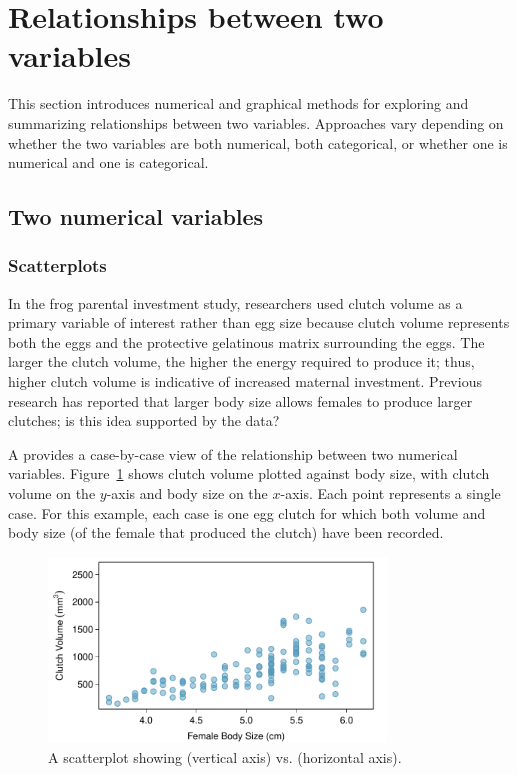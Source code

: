 \section{Relationships between two variables}

This section introduces numerical and graphical methods for exploring and summarizing relationships between two variables. Approaches vary depending on whether the two variables are both numerical, both categorical, or whether one is numerical and one is categorical.

\subsection{Two numerical variables}

\subsubsection{Scatterplots}
\label{scatterPlots}

In the frog parental investment study, researchers used clutch volume as a primary variable of interest rather than egg size because clutch volume represents both the eggs and the protective gelatinous matrix surrounding the eggs. The larger the clutch volume, the higher the energy required to produce it; thus, higher clutch volume is indicative of increased maternal investment. Previous research has reported that larger body size allows females to produce larger clutches; is this idea supported by the  data?

A  provides a case-by-case view of the relationship between two numerical variables. Figure~\ref{frogClutchVolBodySize} shows clutch volume plotted against body size, with clutch volume on the $y$-axis and body size on the $x$-axis. Each point represents a single case. For this example, each case is one egg clutch for which both volume and body size (of the female that produced the clutch) have been recorded.

\begin{figure}[h!]
	\centering
	\includegraphics[width=0.8\textwidth]
	{ch_intro_to_data_oi_biostat/figures/frogClutchVolBodySize/frogClutchVolBodySize}
	\caption{A scatterplot showing  (vertical axis) vs.  (horizontal axis). }
	\label{frogClutchVolBodySize}
\end{figure}


